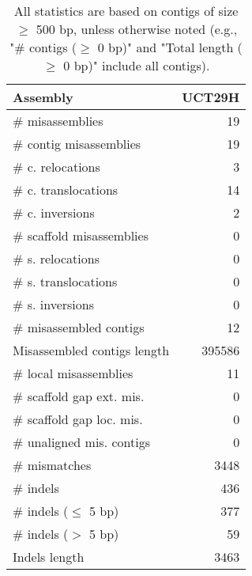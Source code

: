 \documentclass[12pt,a4paper]{article}
\begin{document}
\begin{table}[ht]
\begin{center}
\caption{All statistics are based on contigs of size $\geq$ 500 bp, unless otherwise noted (e.g., "\# contigs ($\geq$ 0 bp)" and "Total length ($\geq$ 0 bp)" include all contigs).}
\begin{tabular}{|l*{1}{|r}|}
\hline
Assembly & UCT29H \\ \hline
\# misassemblies & 19 \\ \hline
\hspace{2mm}\# contig misassemblies & 19 \\ \hline
\hspace{5mm}\# c. relocations & 3 \\ \hline
\hspace{5mm}\# c. translocations & 14 \\ \hline
\hspace{5mm}\# c. inversions & 2 \\ \hline
\hspace{2mm}\# scaffold misassemblies & 0 \\ \hline
\hspace{5mm}\# s. relocations & 0 \\ \hline
\hspace{5mm}\# s. translocations & 0 \\ \hline
\hspace{5mm}\# s. inversions & 0 \\ \hline
\# misassembled contigs & 12 \\ \hline
Misassembled contigs length & 395586 \\ \hline
\# local misassemblies & 11 \\ \hline
\# scaffold gap ext. mis. & 0 \\ \hline
\# scaffold gap loc. mis. & 0 \\ \hline
\# unaligned mis. contigs & 0 \\ \hline
\# mismatches & 3448 \\ \hline
\# indels & 436 \\ \hline
\hspace{5mm}\# indels ($\leq$ 5 bp) & 377 \\ \hline
\hspace{5mm}\# indels ($>$ 5 bp) & 59 \\ \hline
Indels length & 3463 \\ \hline
\end{tabular}
\end{center}
\end{table}
\end{document}

